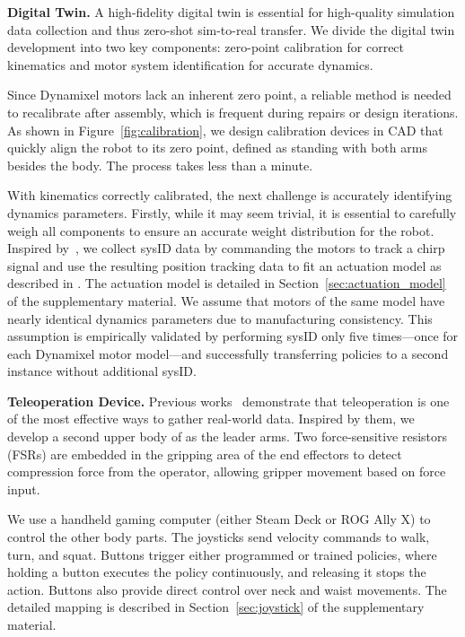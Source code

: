 \textbf{Digital Twin.} A high-fidelity digital twin is essential for high-quality simulation data collection and thus zero-shot sim-to-real transfer.
We divide the digital twin development into two key components: zero-point calibration for correct kinematics and motor system identification for accurate dynamics.

Since Dynamixel motors lack an inherent zero point, a reliable method is needed to recalibrate after assembly, which is frequent during repairs or design iterations. As shown in Figure~\ref{fig:calibration}, we design calibration devices in CAD that quickly align the robot to its zero point, defined as standing with both arms besides the body. The process takes less than a minute.

With kinematics correctly calibrated, the next challenge is accurately identifying dynamics parameters.
Firstly, while it may seem trivial, it is essential to carefully weigh all components to ensure an accurate weight distribution for the robot. Inspired by~\citet{haarnoja2024learning}, we collect sysID data by commanding the motors to track a chirp signal and use the resulting position tracking data to fit an actuation model as described in \citet{grandia2024design}. The actuation model is detailed in Section~\ref{sec:actuation_model} of the supplementary material. 
We assume that motors of the same model have nearly identical dynamics parameters due to manufacturing consistency. This assumption is empirically validated by performing sysID only five times—once for each Dynamixel motor model—and successfully transferring policies to a second \system instance without additional sysID.


\textbf{Teleoperation Device.} Previous works~\citep{aldacoaloha, wu2023gello} demonstrate that teleoperation is one of the most effective ways to gather real-world data. Inspired by them, we develop a second upper body of \system as the leader arms. Two force-sensitive resistors (FSRs) are embedded in the gripping area of the end effectors to detect compression force from the operator, allowing gripper movement based on force input.

We use a handheld gaming computer (either Steam Deck or ROG Ally X) to control the other body parts. The joysticks send velocity commands to walk, turn, and squat. Buttons trigger either programmed or trained policies, where holding a button executes the policy continuously, and releasing it stops the action. Buttons also provide direct control over neck and waist movements. The detailed mapping is described in Section~\ref{sec:joystick} of the supplementary material.